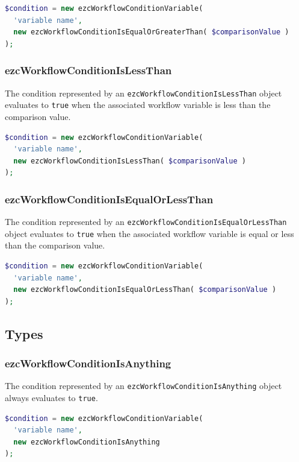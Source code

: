 \begin{lstlisting}[language=PHP]
$condition = new ezcWorkflowConditionVariable(
  'variable name',
  new ezcWorkflowConditionIsEqualOrGreaterThan( $comparisonValue )
);
\end{lstlisting}

\subsubsection{ezcWorkflowConditionIsLessThan}

The condition represented by an \texttt{ezcWorkflowConditionIsLessThan}
object evaluates to \texttt{true} when the associated workflow variable is
less than the comparison value.

\begin{lstlisting}[language=PHP]
$condition = new ezcWorkflowConditionVariable(
  'variable name',
  new ezcWorkflowConditionIsLessThan( $comparisonValue )
);
\end{lstlisting}

\subsubsection{ezcWorkflowConditionIsEqualOrLessThan}

The condition represented by an \texttt{ezcWorkflowConditionIsEqualOrLessThan}
object evaluates to \texttt{true} when the associated workflow variable is
equal or less than the comparison value.

\begin{lstlisting}[language=PHP]
$condition = new ezcWorkflowConditionVariable(
  'variable name',
  new ezcWorkflowConditionIsEqualOrLessThan( $comparisonValue )
);
\end{lstlisting}

\subsection{Types}

\subsubsection{ezcWorkflowConditionIsAnything}

The condition represented by an \texttt{ezcWorkflowConditionIsAnything} object
always evaluates to \texttt{true}.

\begin{lstlisting}[language=PHP]
$condition = new ezcWorkflowConditionVariable(
  'variable name',
  new ezcWorkflowConditionIsAnything
);
\end{lstlisting}

